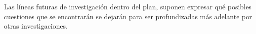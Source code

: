 Las líneas futuras de investigación dentro del plan, suponen expresar qué posibles cuestiones que se encontrarán se dejarán para ser profundizadas más adelante por otras investigaciones.
\textcolor{white}{
\parencite{Beranek2005ConcertHA} 
\parencite{busch2005noise}
\parencite{Call2007SoundP}
\parencite{Gardner2002}
\parencite{iso1996-2}
\parencite{kracht2007noise}
\parencite{Lawson2010SoundIntensity}
\parencite{MacLeod2007QuietingWeinberg}
\parencite{Mazer2012Creating}
\parencite{Orellana2006NoiseIT}
\parencite{richardson2009development}
\parencite{Ryherd2008CharacterizingNA}
\parencite{sanz2012tecnicas}
\parencite{Taylor1958NoiseCI}
\parencite{Tsiou2008Noise}
\parencite{text-to-speech-ibm}
\parencite{West2008NoiseIH}}